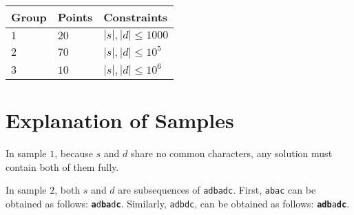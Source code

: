 \noindent
\begin{tabular}{| l | l | p{12cm} |}
  \hline
  \textbf{Group} & \textbf{Points} & \textbf{Constraints} \\ \hline
  $1$    & $20$       & $|s|,|d| \leq 1000$ \\ \hline
  $2$    & $70$       & $|s|,|d| \leq 10^5$ \\ \hline
  $3$    & $10$       & $|s|,|d| \leq 10^6$ \\ \hline
\end{tabular}

\section*{Explanation of Samples}
In sample $1$, because $s$ and $d$ share no common characters, any solution must contain both of them fully.

In sample $2$, both $s$ and $d$ are subsequences of \texttt{adbadc}. First, \texttt{abac} can be obtained as
follows: \texttt{\textbf{a}d\textbf{ba}d\textbf{c}}. Similarly, \texttt{adbdc}, can
be obtained as follows: \texttt{\textbf{adb}a\textbf{dc}}.
